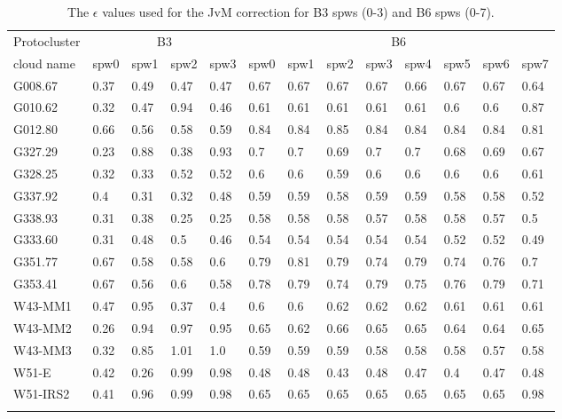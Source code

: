 \begin{table}[htbp!]
\centering
\caption{\label{appendix:tab:epsilon}The $\epsilon$ values used for the JvM correction for B3 spws (0-3) and B6 spws (0-7). }
\begin{tabular}{@{\extracolsep{6pt}}lllllllllllll@{}}
 \hline \noalign {\smallskip}
 Protocluster  & \multicolumn{4}{c}{B3 }& \multicolumn{8}{c}{B6} \\ %
 \cline{2-5} \cline{6-13}
cloud name & spw0& spw1  & spw2 & spw3 & spw0  & spw1  & spw2 & spw3 & spw4 & spw5 & spw6 & spw7 \\
\hline \noalign {\smallskip}
G008.67 & 0.37&0.49&0.47&0.47 & 0.67&0.67&0.67&0.67&0.66&0.67&0.67&0.64 \\
G010.62 & 0.32&0.47&0.94&0.46 & 0.61&0.61&0.61&0.61&0.61&0.6&0.6&0.87 \\
G012.80 & 0.66&0.56&0.58&0.59 & 0.84&0.84&0.85&0.84&0.84&0.84&0.84&0.81 \\
G327.29 & 0.23&0.88&0.38&0.93 & 0.7&0.7&0.69&0.7&0.7&0.68&0.69&0.67 \\
G328.25 & 0.32&0.33&0.52&0.52 & 0.6&0.6&0.59&0.6&0.6&0.6&0.6&0.61 \\
G337.92 & 0.4&0.31&0.32&0.48 & 0.59&0.59&0.58&0.59&0.59&0.58&0.58&0.52 \\
G338.93 & 0.31&0.38&0.25&0.25 & 0.58&0.58&0.58&0.57&0.58&0.58&0.57&0.5 \\
G333.60 & 0.31&0.48&0.5&0.46 & 0.54&0.54&0.54&0.54&0.54&0.52&0.52&0.49 \\
G351.77 & 0.67&0.58&0.58&0.6 & 0.79&0.81&0.79&0.74&0.79&0.74&0.76&0.7 \\
G353.41 & 0.67&0.56&0.6&0.58 & 0.78&0.79&0.74&0.79&0.75&0.76&0.79&0.71 \\
W43-MM1 & 0.47&0.95&0.37&0.4 & 0.6&0.6&0.62&0.62&0.62&0.61&0.61&0.61 \\
W43-MM2 & 0.26&0.94&0.97&0.95 & 0.65&0.62&0.66&0.65&0.65&0.64&0.64&0.65 \\
W43-MM3 & 0.32&0.85&1.01&1.0 & 0.59&0.59&0.59&0.58&0.58&0.58&0.57&0.58 \\
W51-E & 0.42&0.26&0.99&0.98 & 0.48&0.48&0.43&0.48&0.47&0.4&0.47&0.48 \\
W51-IRS2 & 0.41&0.96&0.99&0.98 & 0.65&0.65&0.65&0.65&0.65&0.65&0.65&0.98 \\
\hline \noalign {\smallskip}
\end{tabular}
\end{table}